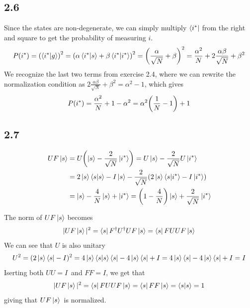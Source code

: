 \documentclass[12p,a4paper]{article}
\newcommand{\0}{\ket{0}}
\newcommand{\1}{\ket{1}}
\begin{document}
\subsection*{2.6}
Since the states are non-degenerate, we can simply multiply $\bra{i^*}$ from the right and square to get the probability of measuring $i$.
\begin{align*}
    P(i^*) = \qty(\bra{i^*}\ket{g})^2 = \qty(\alpha\bra{i^*}\ket{s} +\beta\bra{i^*}\ket{i^*})^2 = \qty(\frac{\alpha}{\sqrt{N}} + \beta)^2 = \frac{\alpha^2}{N} + 2\frac{\alpha\beta}{\sqrt{N}} + \beta^2
\end{align*}
We recognize the last two terms from exercise 2.4, where we can rewrite the normalization condition as $2\frac{\alpha\beta}{\sqrt{N}} + \beta^2 = \alpha^2 - 1$, which gives
\begin{align*}
    P(i^*) = \frac{\alpha^2}{N} + 1 - \alpha^2 = \alpha^2\qty(\frac{1}{N} - 1) + 1
\end{align*}



\subsection*{2.7}
\begin{align*}
    UF\ket{s} &= U\qty(\ket{s} - \frac{2}{\sqrt{N}}\ket{i^*}) = U\ket{s} - \frac{2}{\sqrt{N}}U\ket{i^*}\\
    &= 2\ket{s}\bra{s}\ket{s} - I\ket{s} - \frac{2}{\sqrt{N}}(2\ket{s}\bra{s}\ket{i^*} - I\ket{i^*}) \\
    &= \ket{s} - \frac{4}{N}\ket{s} + \ket{i^*} = \qty(1 - \frac{4}{N})\ket{s} + \frac{2}{\sqrt{N}}\ket{i^*}
\end{align*}

The norm of $UF\ket{s}$ becomes
\begin{align*}
    |UF\ket{s}|^2 = \bra{s}F^\dag U^\dag U F\ket{s} = \bra{s}F U U F\ket{s}
\end{align*}
We can see that $U$ is also unitary
\begin{align*}
    U^2 = (2\ket{s}\bra{s} - I)^2 = 4\ket{s}\bra{s}\ket{s}\bra{s} - 4\ket{s}\bra{s} + I = 4\ket{s}\bra{s} - 4\ket{s}\bra{s} + I = I
\end{align*}
Iserting both $UU = I$ and $FF = I$, we get that
\begin{align*}
    |UF\ket{s}|^2 = \bra{s}F U U F\ket{s} = \bra{s}FF\ket{s} = \bra{s}\ket{s} = 1
\end{align*}
giving that $UF\ket{s}$ is normalized.
\end{document}
